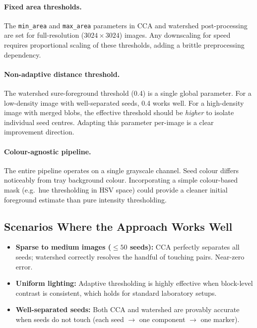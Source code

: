 \documentclass[12pt,a4paper]{article}
\begin{document}
\paragraph{Fixed area thresholds.}
The \texttt{min\_area} and \texttt{max\_area} parameters in CCA and watershed
post-processing are set for full-resolution ($3024 \times 3024$) images. Any
downscaling for speed requires proportional scaling of these thresholds, adding
a brittle preprocessing dependency.

\paragraph{Non-adaptive distance threshold.}
The watershed sure-foreground threshold (0.4) is a single global parameter.
For a low-density image with well-separated seeds, 0.4 works well. For
a high-density image with merged blobs, the effective threshold should be
\emph{higher} to isolate individual seed centres. Adapting this parameter
per-image is a clear improvement direction.

\paragraph{Colour-agnostic pipeline.}
The entire pipeline operates on a single grayscale channel. Seed colour
differs noticeably from tray background colour. Incorporating a simple
colour-based mask (e.g.\ hue thresholding in HSV space) could provide a
cleaner initial foreground estimate than pure intensity thresholding.

\subsection{Scenarios Where the Approach Works Well}

\begin{itemize}
    \item \textbf{Sparse to medium images ($\leq 50$ seeds):} CCA perfectly
          separates all seeds; watershed correctly resolves the handful of
          touching pairs. Near-zero error.
    \item \textbf{Uniform lighting:} Adaptive thresholding is highly effective
          when block-level contrast is consistent, which holds for standard
          laboratory setups.
    \item \textbf{Well-separated seeds:} Both CCA and watershed are provably
          accurate when seeds do not touch (each seed $\rightarrow$ one
          component $\rightarrow$ one marker).
\end{itemize}
\end{document}
